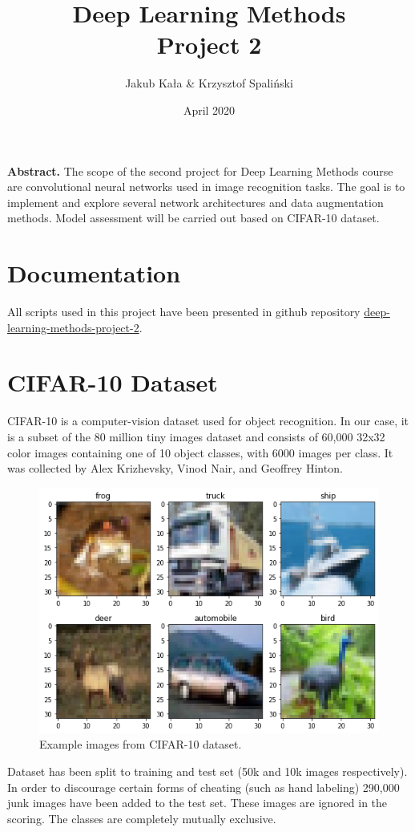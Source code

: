 \documentclass{article}
\title{Deep Learning Methods \\ Project 2}
\author{Jakub Kała \& Krzysztof Spaliński}
\date{April 2020}
\begin{document}
\maketitle

\textbf{Abstract.} The scope of the second project for Deep Learning Methods course are convolutional neural networks used in image recognition tasks. The goal is to implement and explore several network architectures and data augmentation methods. Model assessment will be carried out based on CIFAR-10 dataset.

  
\section{Documentation}
All scripts used in this project have been presented in github repository \href{https://github.com/krzysztofspalinski/deep-learning-methods-project-2}{deep-learning-methods-project-2}.

\section{CIFAR-10 Dataset}

CIFAR-10 \cite{cifar10} is a computer-vision dataset used for object recognition. In our case, it is a subset of the 80 million tiny images dataset and consists of 60,000 32x32 color images containing one of 10 object classes, with 6000 images per class. It was collected by Alex Krizhevsky, Vinod Nair, and Geoffrey Hinton.


\begin{figure}[h!]
    \centering
    \includegraphics[width=0.8\linewidth]{data.png}
    \caption{Example images from CIFAR-10 dataset.}
\end{figure}


Dataset has been split to training and test set (50k and 10k images respectively). In order to discourage certain forms of cheating (such as hand labeling) 290,000 junk images have been added to the test set. These images are ignored in the scoring. The classes are completely mutually exclusive. 
\end{document}

